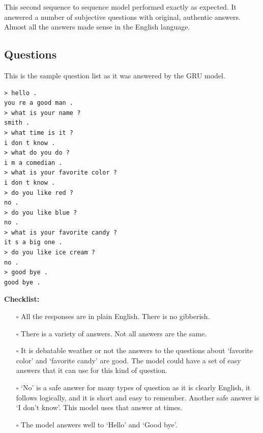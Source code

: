 This second sequence to sequence model performed exactly as expected. It answered a number of subjective questions with original, authentic answers. Almost all the answers made sense in the English language.

\subsection*{Questions}
This is the sample question list as it was answered by the GRU model.

\begin{verbatim}
> hello .
you re a good man .
> what is your name ?
smith .
> what time is it ?
i don t know .
> what do you do ?
i m a comedian .
> what is your favorite color ?
i don t know .
> do you like red ?
no .
> do you like blue ?
no .
> what is your favorite candy ?
it s a big one .
> do you like ice cream ?
no .
> good bye .
good bye .
\end{verbatim}

 
\noindent \textbf{Checklist:} 


\begin{itemize}

\item[\rlap{\raisebox{0.3ex}{\hspace{0.4ex}\scriptsize \ding{52}}}$\square$] All the responses are in plain English. There is no gibberish.

\item[\rlap{\raisebox{0.3ex}{\hspace{0.4ex}\scriptsize \ding{52}}}$\square$] There is a variety of answers. Not all answers are the same.

\item[$\square$] It is debatable weather or not the answers to the questions about `favorite color' and `favorite candy' are good. The model could have a set of easy answers that it can use for this kind of question. 

\item[\rlap{\raisebox{0.3ex}{\hspace{0.4ex}\scriptsize \ding{56}}}$\square$] `No' is a safe answer for many types of question as it is clearly English, it follows logically, and it is short and easy to remember. Another safe answer is `I don't know'. This model uses that answer at times.

\item[\rlap{\raisebox{0.3ex}{\hspace{0.4ex}\scriptsize \ding{52}}}$\square$] The model answers well to `Hello' and `Good bye'.
\end{itemize}


